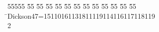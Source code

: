 %
%
\begin{tabbing}
55555 \= 55 \= 55 \= 55 \= 55 \= 55 \= 55 \= 55 \= 55 \= 55 \= 55 \= 55 \= 55 \= \>Dickson47=15110161131811119114116117118119\\[0pt]
2\>\end{tabbing}
